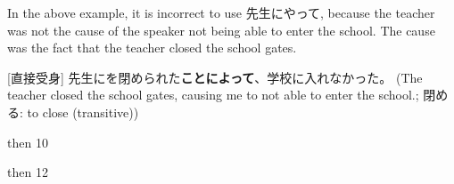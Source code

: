 \documentclass[../nihongo-gakushuu-kyouzai.tex]{subfiles}
\begin{document}
In the above example, it is incorrect to use 先生にやって, because the teacher was not the cause of the speaker not being able to enter the school. The cause was the fact that the teacher closed the school gates.

[直接受身] 先生にを閉められた\textbf{ことによって}、学校に入れなかった。 (The teacher closed the school gates, causing me to not able to enter the school.; 閉める: to close (transitive))



then 10

then 12
\end{document}
